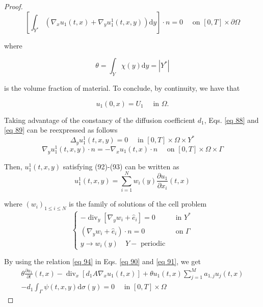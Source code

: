\begin{proof}
\begin{equation}
 {\left[\int_{Y^{*}}\left(\nabla_{x} u_{1}(t, x)+\nabla_{y} u_{1}^{1}(t, x, y)\right) \mathrm{d} y\right] \cdot n=0 \quad \text { on }[0, T] \times \partial \Omega}
\label{eq 91}\end{equation}


where

$$
\theta=\int_{Y} \chi(y) \mathrm{d} y=\left|Y^{*}\right|
$$

is the volume fraction of material. To conclude, by continuity, we have that

$$
u_{1}(0, x)=U_{1} \quad \text { in } \Omega .
$$

Taking advantage of the constancy of the diffusion coefficient $d_{1}$, Eqs. \eqref{eq 88} and \eqref{eq 89} can be reexpressed as follows
\begin{equation}
\Delta_{y} u_{1}^{1}(t, x, y)=0 \quad \text { in }[0, T] \times \Omega \times Y^{*} 
\label{eq 92}\end{equation}
\begin{equation}
 \nabla_{y} u_{1}^{1}(t, x, y) \cdot n=-\nabla_{x} u_{1}(t, x) \cdot n \quad \text { on }[0, T] \times \Omega \times \Gamma
\label{eq 93}\end{equation}


Then, $u_{1}^{1}(t, x, y)$ satisfying (92)-(93) can be written as
\begin{equation}
 u_{1}^{1}(t, x, y)=\sum_{i=1}^{N} w_{i}(y) \frac{\partial u_{1}}{\partial x_{i}}(t, x)
\label{eq 94}\end{equation}



where $\left(w_{i}\right)_{1 \leq i \leq N}$ is the family of solutions of the cell problem
\begin{equation}
 \begin{cases}-\operatorname{div}_{y}\left[\nabla_{y} w_{i}+\hat{e}_{i}\right]=0 & \text { in } Y^{*} \\ \left(\nabla_{y} w_{i}+\hat{e}_{i}\right) \cdot n=0 & \text { on } \Gamma \\ y \rightarrow w_{i}(y) \quad Y-\text { periodic } & \end{cases}
\label{eq 95}\end{equation}


By using the relation \eqref{eq 94} in Eqs. \eqref{eq 90} and \eqref{eq 91}, we get
\begin{equation}
 \begin{split}
    \theta \frac{\partial u_{1}}{\partial t}(t, x)-\operatorname{div}_{x}\left[d_{1} A \nabla_{x} u_{1}(t, x)\right]+\theta u_{1}(t, x) \sum_{j=1}^{M} a_{1, j} u_{j}(t, x) \\
   -d_{1} \int_{\Gamma} \psi(t, x, y) \mathrm{d} \sigma(y)=0 \quad \text { in }[0, T] \times \Omega
 \end{split}
\label{eq 96}\end{equation}


\end{proof}
